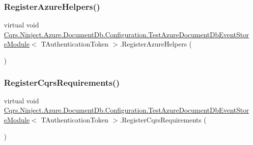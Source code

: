 \subsubsection{\texorpdfstring{Register\+Azure\+Helpers()}{RegisterAzureHelpers()}}
{\footnotesize\ttfamily virtual void \hyperlink{classCqrs_1_1Ninject_1_1Azure_1_1DocumentDb_1_1Configuration_1_1TestAzureDocumentDbEventStoreModule}{Cqrs.\+Ninject.\+Azure.\+Document\+Db.\+Configuration.\+Test\+Azure\+Document\+Db\+Event\+Store\+Module}$<$ T\+Authentication\+Token $>$.Register\+Azure\+Helpers (\begin{DoxyParamCaption}{ }\end{DoxyParamCaption})\hspace{0.3cm}{\ttfamily [virtual]}}

\mbox{\label{classCqrs_1_1Ninject_1_1Azure_1_1DocumentDb_1_1Configuration_1_1TestAzureDocumentDbEventStoreModule_a443538da52dc0bd6943586b1412d7329_a443538da52dc0bd6943586b1412d7329}} 
\subsubsection{\texorpdfstring{Register\+Cqrs\+Requirements()}{RegisterCqrsRequirements()}}
{\footnotesize\ttfamily virtual void \hyperlink{classCqrs_1_1Ninject_1_1Azure_1_1DocumentDb_1_1Configuration_1_1TestAzureDocumentDbEventStoreModule}{Cqrs.\+Ninject.\+Azure.\+Document\+Db.\+Configuration.\+Test\+Azure\+Document\+Db\+Event\+Store\+Module}$<$ T\+Authentication\+Token $>$.Register\+Cqrs\+Requirements (\begin{DoxyParamCaption}{ }\end{DoxyParamCaption})\hspace{0.3cm}{\ttfamily [virtual]}}



